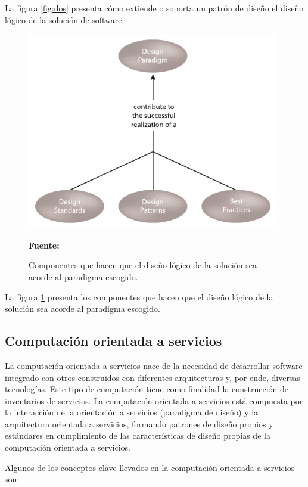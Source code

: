 La figura \ref{fig:dos} presenta cómo extiende o soporta un patrón de diseño el diseño lógico de la solución de software.

\begin{figure}[!htb]
  \begin{center}
    \includegraphics[width=11cm]{./imagenes/3.png}
    \caption{Componentes que hacen que el diseño lógico de la solución sea acorde al paradigma escogido.}
    \label{fig:tres}
    \textbf{Fuente:}  \cite{soa_principles}
  \end{center}
\end{figure}

La figura \ref{fig:tres} presenta los componentes que hacen que el diseño lógico de la solución sea acorde al paradigma escogido.

\subsection{Computación orientada a servicios}

La computación orientada a servicios nace de la necesidad de desarrollar software integrado con otros construidos con diferentes arquitecturas y, por ende, diversas tecnologías. Este tipo de computación tiene como finalidad la construcción de inventarios de servicios. La computación orientada a servicios está compuesta por la interacción de la orientación a servicios (paradigma de diseño) y la arquitectura orientada a servicios, formando patrones de diseño propios y estándares en cumplimiento de las características de diseño propias de la computación orientada a servicios. 

Algunos de los conceptos clave llevados en la computación orientada a servicios son:

